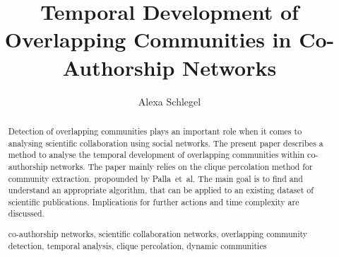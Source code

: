 \documentclass[runningheads,a4paper]{llncs}
\newcommand{\keywords}[1]{\par\addvspace\baselineskip
\noindent\keywordname\enspace\ignorespaces#1}
\begin{document}
\mainmatter  %

\title{Temporal Development of Overlapping Communities in Co-Authorship Networks}


%
%
\author{Alexa Schlegel%
}
%


%
%

\maketitle


\begin{abstract}
Detection of overlapping communities plays an important role when it comes to analysing scientific collaboration using social networks. The present paper describes a method to analyse the temporal development of overlapping communities within co-authorship networks. The paper mainly relies on the clique percolation method for community extraction. propounded by Palla~et~al. The main goal is to find and understand an appropriate algorithm, that can be applied to an existing dataset of scientific publications. Implications for further actions and time complexity are discussed.

\keywords{co-authorship networks, scientific collaboration networks, overlapping community detection, temporal analysis, clique percolation, dynamic communities}
\end{abstract}
\end{document}
